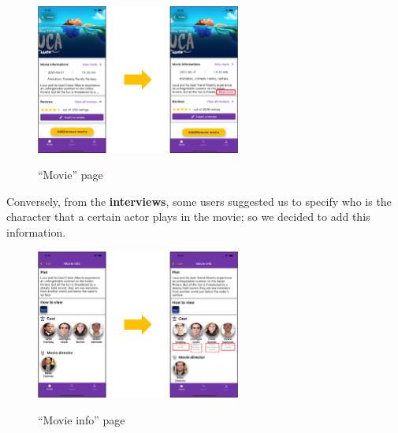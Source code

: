 \documentclass[12pt, a4paper]{article}
\numberwithin{figure}{section}
\begin{document}
\begin{center}
	\begin{figure}[H]
		\centering
		\includegraphics[width=0.6\textwidth]{images/prototype2/movie.png}\\
		\caption{“Movie” page}
	\end{figure}
\end{center}
\vspace*{-0.5cm}
\noindent
Conversely, from the \textbf{interviews}, some users suggested us to specify who is the character
that a certain actor plays in the movie; so we decided to add this information.
\begin{center}
	\begin{figure}[H]
		\centering
		\includegraphics[width=0.6\textwidth]{images/prototype2/movieInfo.png}\\
		\caption{“Movie info” page}
	\end{figure}
\end{center}
\vspace*{-1.5cm}
\end{document}
